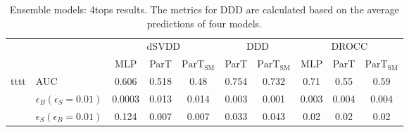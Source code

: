 \begin{table}[H]
    \centering
    \setlength{\tabcolsep}{4pt}
    \begin{tabular}{ll|ccc|cc|ccc}
    \hline
    \multicolumn{2}{c|}{} & \multicolumn{3}{c|}{dSVDD} & \multicolumn{2}{c|}{DDD} & \multicolumn{3}{c}{DROCC} \\
     & & MLP & ParT & $\text{ParT}_{\text{SM}}$ & ParT & $\text{ParT}_{\text{SM}}$ & MLP & ParT & $\text{ParT}_{\text{SM}}$ \\ 
    \hline \hline
    \multirow{3}{*}{tttt} & AUC & 0.606 & 0.518 & 0.48 & 0.754 & 0.732 & 0.71 & 0.55 & 0.59 \\
    & $\epsilon_B(\epsilon_S=0.01)$           & 0.0003 & 0.013 & 0.014 & 0.003 & 0.001 & 0.003   & 0.004   & 0.004   \\
    & $\epsilon_S(\epsilon_B=0.01)$           & 0.124 & 0.007 & 0.007 & 0.033 & 0.043 & 0.02 & 0.02 & 0.02 \\
    \hline  
    \hline  
    \end{tabular}
    \caption{Ensemble models: 4tops results. The metrics for DDD are calculated based on the average predictions of four models.}
    \label{tab:4top_all}
\end{table}